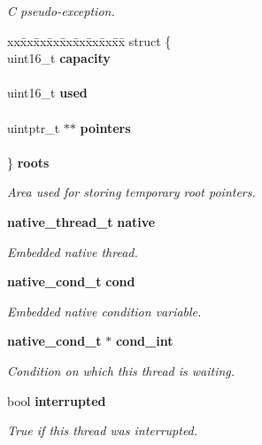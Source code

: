 \begin{DoxyCompactItemize}
\begin{tabbing}
\end{tabbing}\begin{DoxyCompactList}\small\item\em C pseudo-\/exception. \item\end{DoxyCompactList}\item 
\begin{tabbing}
xx\=xx\=xx\=xx\=xx\=xx\=xx\=xx\=xx\=\kill
struct \{\\
\>uint16\_t {\bf capacity}\\
\>\\
\>uint16\_t {\bf used}\\
\>\\
\>uintptr\_t $\ast$$\ast$ {\bf pointers}\\
\>\\
\} {\bf roots}\label{structthread__t_a9039e0ee51deacedc5afc21bbee53c7f}
\\

\end{tabbing}\begin{DoxyCompactList}\small\item\em Area used for storing temporary root pointers. \item\end{DoxyCompactList}\item 
{\bf native\_\-thread\_\-t} {\bf native}\label{structthread__t_ad64c5234b491b2acaa9d91f6d13574c0}

\begin{DoxyCompactList}\small\item\em Embedded native thread. \item\end{DoxyCompactList}\item 
{\bf native\_\-cond\_\-t} {\bf cond}\label{structthread__t_a97f0b48764c21a2ce23bac35bfd10dc6}

\begin{DoxyCompactList}\small\item\em Embedded native condition variable. \item\end{DoxyCompactList}\item 
{\bf native\_\-cond\_\-t} $\ast$ {\bf cond\_\-int}\label{structthread__t_a703825a75bf9b6c441eb6ae8da4a0201}

\begin{DoxyCompactList}\small\item\em Condition on which this thread is waiting. \item\end{DoxyCompactList}\item 
bool {\bf interrupted}\label{structthread__t_a820c1cbcd3d0f31be537242f2befbf07}

\begin{DoxyCompactList}\small\item\em True if this thread was interrupted. \item\end{DoxyCompactList}\end{DoxyCompactItemize}


